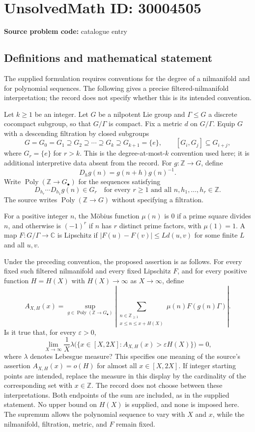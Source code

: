 \documentclass[11pt]{article}
\newcommand{\Z}{\mathbb{Z}}
\newcommand{\C}{\mathbb{C}}
\begin{document}
\section*{UnsolvedMath ID: 30004505}
\textbf{Source problem code:} catalogue entry
\subsection{Definitions and mathematical statement}
The supplied formulation requires conventions for the degree of a nilmanifold and for polynomial sequences. The following gives a precise filtered-nilmanifold interpretation; the record does not specify whether this is its intended convention.

Let \(k\geq 1\) be an integer. Let \(G\) be a nilpotent Lie group and \(\Gamma\leq G\) a discrete cocompact subgroup, so that \(G/\Gamma\) is compact. Fix a metric \(d\) on \(G/\Gamma\). Equip \(G\) with a descending filtration by closed subgroups
\[
G=G_0=G_1\supseteq G_2\supseteq\cdots\supseteq G_k\supseteq G_{k+1}=\{e\},
\qquad [G_i,G_j]\subseteq G_{i+j},
\]
where \(G_r=\{e\}\) for \(r>k\). This is the degree-at-most-\(k\) convention used here; it is additional interpretive data absent from the record. For \(g:\Z\to G\), define
\[
D_hg(n)=g(n+h)g(n)^{-1}.
\]
Write \(\operatorname{Poly}(\Z\to G_\bullet)\) for the sequences satisfying
\[
D_{h_r}\cdots D_{h_1}g(n)\in G_r
\quad\text{for every }r\geq1\text{ and all }n,h_1,\ldots,h_r\in\Z.
\]
The source writes \(\operatorname{Poly}(\Z\to G)\) without specifying a filtration.

For a positive integer \(n\), the M\"obius function \(\mu(n)\) is \(0\) if a prime square divides \(n\), and otherwise is \((-1)^r\) if \(n\) has \(r\) distinct prime factors, with \(\mu(1)=1\). A map \(F:G/\Gamma\to\C\) is Lipschitz if \(|F(u)-F(v)|\leq Ld(u,v)\) for some finite \(L\) and all \(u,v\).

Under the preceding convention, the proposed assertion is as follows. For every fixed such filtered nilmanifold and every fixed Lipschitz \(F\), and for every positive function \(H=H(X)\) with \(H(X)\to\infty\) as \(X\to\infty\), define
\[
A_{X,H}(x)=\sup_{g\in\operatorname{Poly}(\Z\to G_\bullet)}
\left|\sum_{\substack{n\in\Z_{\geq1}\\x\leq n\leq x+H(X)}}\mu(n)F(g(n)\Gamma)\right|.
\]
Is it true that, for every \(\varepsilon>0\),
\[
\lim_{X\to\infty}\frac{1}{X}\lambda\bigl(\{x\in[X,2X]:A_{X,H}(x)>\varepsilon H(X)\}\bigr)=0,
\]
where \(\lambda\) denotes Lebesgue measure? This specifies one meaning of the source's assertion \(A_{X,H}(x)=o(H)\) for almost all \(x\in[X,2X]\). If integer starting points are intended, replace the measure in this display by the cardinality of the corresponding set with \(x\in\Z\). The record does not choose between these interpretations. Both endpoints of the sum are included, as in the supplied statement. No upper bound on \(H(X)\) is supplied, and none is imposed here. The supremum allows the polynomial sequence to vary with \(X\) and \(x\), while the nilmanifold, filtration, metric, and \(F\) remain fixed.
\end{document}
